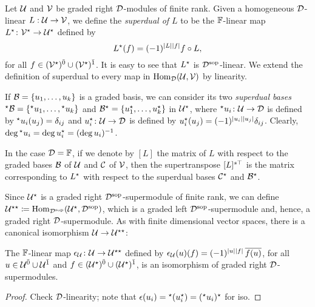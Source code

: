 \begin{defi}\label{defi:superdual-map}
    Let $\mathcal U$ and $\mathcal V$ be graded right $\mathcal{D}$-modules of finite rank. 
    Given a homogeneous $\mathcal{D}$-linear
    $L:\mathcal U \rightarrow \mathcal V$, we define the \emph{superdual of $L$} to be the $\mathbb{F}$-linear map $L^\star\colon \mathcal V^\star \rightarrow \mathcal U^\star$ defined by
    \[
        L^\star (f) = (-1)^{|L||f|} f \circ L,
    \] 
    for all $f\in (\mathcal V^\star)^{\bar0} \cup (\mathcal V^\star)^{\bar1}$. 
    It is easy to see that $L^\star$ is $\mathcal{D}^{\mathrm{sop}}$-linear. 
    We extend the definition of superdual to every map in $\operatorname{Hom}_{\mathcal{D}} (\mathcal U, \mathcal V)$ by linearity.
\end{defi}

\begin{defi}\label{defi:two-dual-bases}
    If $\mathcal B = \{u_1, \ldots, u_k\}$ is a graded basis, we can consider its two \emph{superdual bases} ${}^\star \mathcal B = \{{}^\star u_1, \ldots, {}^\star u_k\}$ and $\mathcal B^\star = \{u_1^\star, \ldots, u_k^\star\}$ in $\mathcal U^\star$, where ${}^\star u_i \colon \mathcal U \rightarrow \mathcal{D}$ is defined by ${}^\star u_i(u_j) = \delta_{ij}$ and $u_i^\star \colon \mathcal U \rightarrow \mathcal{D}$ is defined by $u_i^\star (u_j) = (-1)^{|u_i||u_j|} \delta_{ij}$. 
    Clearly, $\deg {}^\star u_i = \deg  u_i^\star = (\deg u_i)^{-1}$. 
\end{defi}

\begin{remark}
	In the case $\mathcal{D}=\mathbb{F}$, if we denote by $[L]$ the matrix of $L$ with respect to the graded bases $\mathcal B$ of $\mathcal U$ and $\mathcal C$ of $\mathcal V$, then the supertranspose $[L]^{s\top}$ is the matrix corresponding to $L^\star$ with respect to the superdual bases $\mathcal C^\star$ and $\mathcal B^\star$.
\end{remark}

Since $\mathcal U^\star$ is a graded right $\mathcal{D}^{\mathrm{sop}}$-supermodule of finite rank, we can define $\mathcal U^{\star\star} \coloneqq \operatorname{Hom}_{\mathcal{D}^{\mathrm{sop}}} (\mathcal U^\star, \mathcal{D}^{\mathrm{sop}})$, which is a graded left $\mathcal{D}^{\mathrm{sop}}$-supermodule and, hence, a graded right $\mathcal{D}$-supermodule. 
As with finite dimensional vector spaces, there is a canonical isomorphism $\mathcal U \to \mathcal U^{\star\star}$: 

\begin{lemma}\label{lemma:double-dual}
    The $\mathbb{F}$-linear map $\epsilon_\mathcal U\colon \mathcal U \to \mathcal U^{\star\star}$ defined by $\epsilon_\mathcal U(u)(f) = (-1)^{|u||f|}\, \overline{f(u)}$, for all $u \in \mathcal U^{\bar0} \cup \mathcal U^{\bar1}$ and $f \in (\mathcal U^\star)^{\bar0} \cup (\mathcal U^\star)^{\bar1}$, is an isomorphism of graded right $\mathcal{D}$-supermodules. 
\end{lemma}

\begin{proof}
    Check $\mathcal{D}$-linearity; note that $\epsilon(u_i) = {}^\star (u_i ^\star) = ({}^\star u_i) ^\star$ for iso.
\end{proof}

